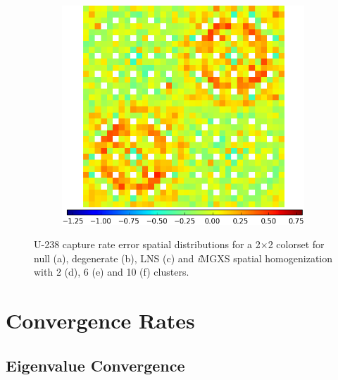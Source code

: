 \begin{figure}[h!]
\begin{subfigure}{0.45\textwidth}
  \caption{}
  \label{fig:chap11-assm-2x2-capt-pinch-6}
\end{subfigure}%
\begin{subfigure}{0.45\textwidth}
  \centering
  \includegraphics[width=\linewidth]{figures/results/2x2/ensemble-transform/capt-err-pinch-agglomerative-(10)}
  \caption{}
  \label{fig:chap11-assm-2x2-capt-pinch-10}
\end{subfigure}
\vspace{2mm}
\caption[U-238 capture rate errors for a 2$\times$2 colorset]{U-238 capture rate error spatial distributions for a 2$\times$2 colorset for null (a), degenerate (b), \ac{LNS} (c) and \textit{i}\ac{MGXS} spatial homogenization with 2 (d), 6 (e) and 10 (f) clusters.}
\label{fig:chap11-assm-2x2-capt-rates}
\end{figure}

\clearpage


\section{Convergence Rates}
\label{sec:chap11-convergence}

\subsection{Eigenvalue Convergence}
\label{subsec:chap11-eigenvalue-converge}


